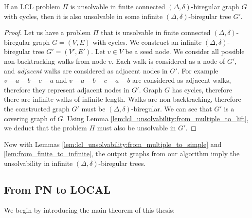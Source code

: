 \begin{lemma} \label{lem:from_finite_to_infinite}
    If an LCL problem $\Pi$ is unsolvable in finite connected $(\Delta, \delta)$-biregular graph $G$ with cycles, then it is also unsolvable in some infinite $(\Delta, \delta)$-biregular tree $G'$.
\end{lemma}
\begin{proof}
    Let us have a problem $\Pi$ that is unsolvable in finite connected $(\Delta, \delta)$-biregular graph $G=(V, E)$ with cycles.
    We construct an infinite $(\Delta, \delta)$-biregular tree $G'=(V', E')$.
    Let $v \in V$ be a seed node.
    We consider all possible non-backtracking walks from node $v$.
    Each walk is considered as a node of $G'$, and \emph{adjacent} walks are considered as adjacent nodes in $G'$.
    For example $v-a-b-c-a$ and $v-a-b-c-a-b$ are considered as adjacent walks, therefore they represent adjacent nodes in $G'$.
    Graph $G$ has cycles, therefore there are infinite walks of infinite length.
    Walks are non-backtracking, therefore the constructed graph $G'$ must be $(\Delta, \delta)$-biregular.
    We can see that $G'$ is a covering graph of $G$.
    Using Lemma \ref{lem:lcl_unsolvability:from_multiple_to_lift}, we deduct that the problem $\Pi$ must also be unsolvable in $G'$.
\end{proof}


Now with Lemmas \ref{lem:lcl_unsolvability:from_multiple_to_simple} and \ref{lem:from_finite_to_infinite}, the output graphs from our algorithm imply the unsolvability in infinite $(\Delta, \delta)$-biregular trees.



\subsection{From PN to LOCAL} \label{sec:algorithm:from_pn_to_local}

We begin by introducing the main theorem of this thesis:

